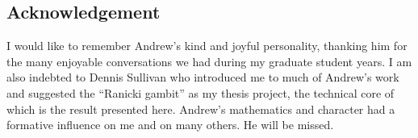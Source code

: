 
\subsection*{Acknowledgement}

I would like to remember Andrew's kind and joyful personality, thanking him for the many enjoyable conversations we had during my graduate student years.
I am also indebted to Dennis Sullivan who introduced me to much of Andrew's work and suggested the ``Ranicki gambit'' as my thesis project, the technical core of which is the result presented here.
Andrew's mathematics and character had a formative influence on me and on many others.
He will be missed.